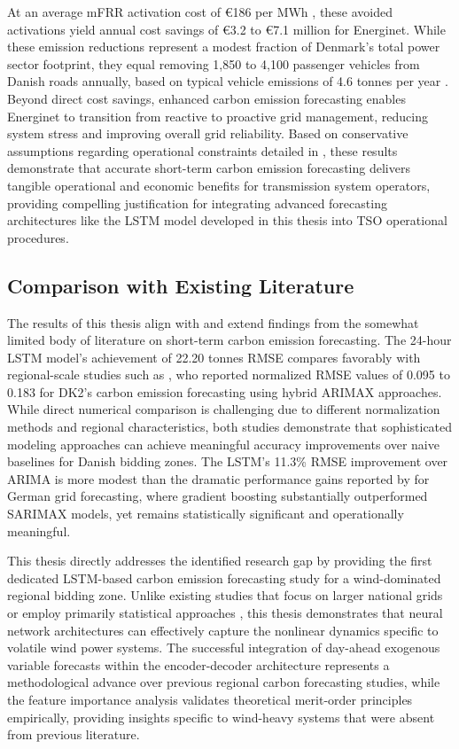 At an average mFRR activation cost of \euro186 per MWh \parencite{energinet2024}, these avoided activations yield annual cost savings of \euro3.2 to \euro7.1 million for Energinet. While these emission reductions represent a modest fraction of Denmark's total power sector footprint, they equal removing 1,850 to 4,100 passenger vehicles from Danish roads annually, based on typical vehicle emissions of 4.6 tonnes \cotwoe{} per year \parencite{usepa2023}. Beyond direct cost savings, enhanced carbon emission forecasting enables Energinet to transition from reactive to proactive grid management, reducing system stress and improving overall grid reliability. Based on conservative assumptions regarding operational constraints detailed in , these results demonstrate that accurate short-term carbon emission forecasting delivers tangible operational and economic benefits for transmission system operators, providing compelling justification for integrating advanced forecasting architectures like the LSTM model developed in this thesis into TSO operational procedures.

\subsection{Comparison with Existing Literature}

The results of this thesis align with and extend findings from the somewhat limited body of literature on short-term carbon emission forecasting. The 24-hour LSTM model's achievement of 22.20 tonnes \cotwoe{} RMSE compares favorably with regional-scale studies such as \textcite{leerbeck2020}, who reported normalized RMSE values of 0.095 to 0.183 for DK2's carbon emission forecasting using hybrid ARIMAX approaches. While direct numerical comparison is challenging due to different normalization methods and regional characteristics, both studies demonstrate that sophisticated modeling approaches can achieve meaningful accuracy improvements over naive baselines for Danish bidding zones. The LSTM's 11.3\% RMSE improvement over ARIMA is more modest than the dramatic performance gains reported by \textcite{ostermann2024} for German grid forecasting, where gradient boosting substantially outperformed SARIMAX models, yet remains statistically significant and operationally meaningful.

This thesis directly addresses the identified research gap by providing the first dedicated LSTM-based carbon emission forecasting study for a wind-dominated regional bidding zone. Unlike existing studies that focus on larger national grids \parencite{ostermann2024,bokde2021} or employ primarily statistical approaches \parencite{leerbeck2020}, this thesis demonstrates that neural network architectures can effectively capture the nonlinear dynamics specific to volatile wind power systems. The successful integration of day-ahead exogenous variable forecasts within the encoder-decoder architecture represents a methodological advance over previous regional carbon forecasting studies, while the feature importance analysis validates theoretical merit-order principles empirically, providing insights specific to wind-heavy systems that were absent from previous literature.

